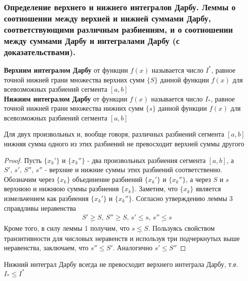 \documentclass[10pt]{article}
\begin{document}
    \subsubsection{Определение верхнего и нижнего интегралов Дарбу. Леммы о соотношении между верхней и нижней суммами Дарбу, соответствующими различным разбиениям, и о соотношении между суммами Дарбу и интегралами Дарбу (с доказательствами).}
    \begin{definition}
        \textbf{Верхним интегралом Дарбу} от функции $f(x)$ называется число $I^*$, равное точной нижней грани множества верхних сумм $\{S\}$ данной функции $f(x)$ для всевозможных разбиений сегмента $[a, b]$\\
        \textbf{Нижним интегралом Дарбу} от функции $f(x)$ называется число $I_*$, равное точной нижней грани множества нижних сумм $\{s\}$ данной функции $f(x)$ для всевозможных разбиений сегмента $[a, b]$\\
    \end{definition}
    \begin{lemma}
        Для двух произвольных и, вообще говоря, различных разбиений сегмента $[a, b]$ нижняя сумма одного из этих разбиений не превосходит верхней суммы другого
    \end{lemma}
    \begin{proof}
        Пусть $\{x_k'\}$ и $\{x_k''\}$ - два произвольных разбиения сегмента $[a, b]$, а $S',\,s',\,S'',\,s''$ - верхние и нижние суммы этих разбиений соответственно. Обозначим через $\{x_k\}$ объединение разбиений $\{x_k'\}$ и $\{x_k''\}$, а через $S$ и $s$ верхнюю и нижнюю суммы разбиения $\{x_k\}$. Заметим, что $\{x_k\}$ является измельчением как разбиения $\{x_k'\}$ и $\{x_k''\}$. Согласно утверждению леммы 3 справдливы неравенства
        \begin{gather*}
            \underline{S' \geq  S},\, S'' \geq S,\, s' \leq s,\, \underline{s'' \leq s}
        \end{gather*}
        Кроме того, в силу леммы 1 получим, что $\underline{s \leq S}$. Пользуясь свойством транзитивности для числовых неравенств и используя три подчеркнутых выше неравенства, заключаем, что $s'' \leq S'$. Аналогично $s' \leq S''$
    \end{proof}
    \begin{lemma}
        Нижний интеграл Дарбу всегда не превосходит верхнего интеграла Дарбу, т.е. $I_* \leq I^*$
    \end{lemma}
\end{document}
